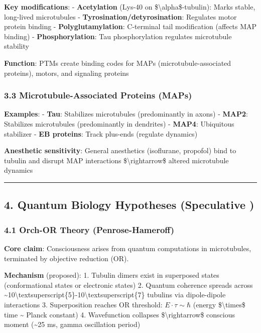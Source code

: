 \textbf{Key modifications}: - \textbf{Acetylation} (Lys-40 on
\$\textbackslash alpha\$-tubulin): Marks stable, long-lived microtubules
- \textbf{Tyrosination/detyrosination}: Regulates motor protein binding
- \textbf{Polyglutamylation}: C-terminal tail modification (affects MAP
binding) - \textbf{Phosphorylation}: Tau phosphorylation regulates
microtubule stability

\textbf{Function}: PTMs create binding codes for MAPs
(microtubule-associated proteins), motors, and signaling proteins

\subsubsection{3.3 Microtubule-Associated Proteins
(MAPs)}\label{microtubule-associated-proteins-maps}

\textbf{Examples}: - \textbf{Tau}: Stabilizes microtubules
(predominantly in axons) - \textbf{MAP2}: Stabilizes microtubules
(predominantly in dendrites) - \textbf{MAP4}: Ubiquitous stabilizer -
\textbf{EB proteins}: Track plus-ends (regulate dynamics)

\textbf{Anesthetic sensitivity}: General anesthetics (isoflurane,
propofol) bind to tubulin and disrupt MAP interactions
\$\textbackslash rightarrow\$ altered microtubule dynamics

\begin{center}\rule{0.5\linewidth}{0.5pt}\end{center}

\subsection{4. Quantum Biology Hypotheses (Speculative
)}\label{quantum-biology-hypotheses-speculative}

\subsubsection{4.1 Orch-OR Theory
(Penrose-Hameroff)}\label{orch-or-theory-penrose-hameroff}

\textbf{Core claim}: Consciousness arises from quantum computations in
microtubules, terminated by objective reduction (OR).

\textbf{Mechanism} (proposed): 1. Tubulin dimers exist in superposed
states (conformational states or electronic states) 2. Quantum coherence
spreads across
\textasciitilde10\textbackslash textsuperscript\{5\}-10\textbackslash textsuperscript\{7\}
tubulins via dipole-dipole interactions 3. Superposition reaches OR
threshold: \(E \cdot \tau \sim \hbar\) (energy \$\textbackslash times\$
time \textasciitilde{} Planck constant) 4. Wavefunction collapses
\$\textbackslash rightarrow\$ conscious moment (\textasciitilde25 ms,
gamma oscillation period)

